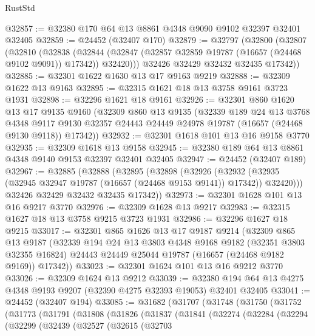 \begin{lexlean}{RustStd}
\begin{coremodule}
@32857 := @32380 @170 @64 @13 @8861 @4348 @9090 @9102 @32397 @32401 @32405
@32859 := @24452 (@32407 @170)
@32879 := @32797
    (@32800
      (@32807
        (@32810
          (@32838
            (@32844 (@32847 (@32857 @32859 @19787 (@16657 (@24468 @9102 @9091)) @17342)) @32420)))
        @32426
        @32429
        @32432
        @32435
        @17342))
@32885 := @32301 @1622 @1630 @13 @17 @9163 @9219
@32888 := @32309 @1622 @13 @9163
@32895 := @32315 @1621 @18 @13 @3758 @9161 @3723 @1931
@32898 := @32296 @1621 @18 @9161
@32926 := @32301
    @860
    @1620
    @13
    @17
    @9135
    @9160
    (@32309
      @860
      @13
      @9135
      (@32339
        @189
        @24
        @13
        @3768
        @4348
        @9117
        @9130
        @32357
        @24443
        @24449
        @24978
        @19787
        (@16657 (@24468 @9130 @9118))
        @17342))
@32932 := @32301 @1618 @101 @13 @16 @9158 @3770
@32935 := @32309 @1618 @13 @9158
@32945 := @32380 @189 @64 @13 @8861 @4348 @9140 @9153 @32397 @32401 @32405
@32947 := @24452 (@32407 @189)
@32967 := @32885
    (@32888
      (@32895
        (@32898
          (@32926
            (@32932 (@32935 (@32945 @32947 @19787 (@16657 (@24468 @9153 @9141)) @17342)) @32420)))
        @32426
        @32429
        @32432
        @32435
        @17342))
@32973 := @32301 @1628 @101 @13 @16 @9217 @3770
@32976 := @32309 @1628 @13 @9217
@32983 := @32315 @1627 @18 @13 @3758 @9215 @3723 @1931
@32986 := @32296 @1627 @18 @9215
@33017 := @32301
    @865
    @1626
    @13
    @17
    @9187
    @9214
    (@32309
      @865
      @13
      @9187
      (@32339
        @194
        @24
        @13
        @3803
        @4348
        @9168
        @9182
        (@32351 @3803 @32355 @16824)
        @24443
        @24449
        @25044
        @19787
        (@16657 (@24468 @9182 @9169))
        @17342))
@33023 := @32301 @1624 @101 @13 @16 @9212 @3770
@33026 := @32309 @1624 @13 @9212
@33039 := @32380 @194 @64 @13 @4275 @4348 @9193 @9207 (@32390 @4275 @32393 @19053) @32401 @32405
@33041 := @24452 (@32407 @194)
@33085 := @31682
    (@31707
      (@31748
        (@31750
          (@31752
            (@31773
              (@31791
                (@31808
                  (@31826
                    (@31837
                      (@31841
                        (@32274
                          (@32284
                            (@32294
                              (@32299
                                (@32439
                                  (@32527
                                    (@32615
                                      (@32703

\end{coremodule}
\end{lexlean}
